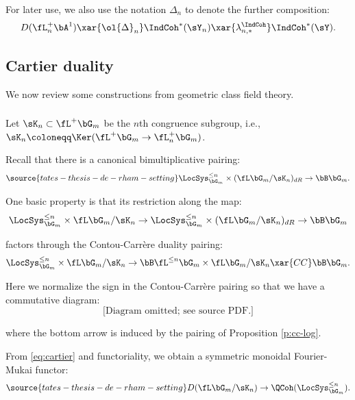 \subsubsection{}\label{sss:delta-n}

For later use, we also use the notation
$\Delta_n$ to denote the further composition:
%
\[
D(\fL_n^+\bA^1) \xar{\ol{\Delta}_n} \IndCoh^*(\sY_n)
\xar{\lambda_{n,*}^{\IndCoh}} \IndCoh^*(\sY).
\]

\subsection{Cartier duality}

We now review some constructions from geometric class field theory.

\subsubsection{}

Let $\sK_n \subset \fL^+ \bG_m$ be the $n$th congruence subgroup,
i.e., $\sK_n \coloneqq \Ker(\fL^+\bG_m \to \fL_n^+\bG_m)$.

Recall that there is a canonical bimultiplicative pairing:
%
\begin{equation}\label{eq:cartier}
\source{tates-thesis-de-rham-setting}
\LocSys_{\bG_m}^{\leq n} \times (\fL\bG_m/\sK_n)_{dR} \to \bB \bG_m.
\end{equation}

 One basic property is that its restriction along the map:
%
\[
\LocSys_{\bG_m}^{\leq n} \times \fL\bG_m/\sK_n
\to
\LocSys_{\bG_m}^{\leq n} \times (\fL\bG_m/\sK_n)_{dR} \to \bB \bG_m
\]

 factors through the Contou-Carr\`ere duality pairing:
%
\[
\LocSys_{\bG_m}^{\leq n} \times \fL\bG_m/\sK_n \to
\bB \fL^{\leq n} \bG_m \times \fL\bG_m/\sK_n \xar{CC}
\bB \bG_m.
\]

 Here we normalize the sign in the Contou-Carr\`ere pairing
so that we have a commutative diagram:
%
\[
\text{[Diagram omitted; see source PDF.]}
\]

 where the bottom arrow is induced by the pairing of
Proposition \ref{p:cc-log}.

From \eqref{eq:cartier} and functoriality, we obtain a symmetric
monoidal Fourier-Mukai functor:
%
\begin{equation}\label{eq:trun-lcft}
\source{tates-thesis-de-rham-setting}
D(\fL\bG_m/\sK_n) \to \QCoh(\LocSys_{\bG_m}^{\leq n}).
\end{equation}

